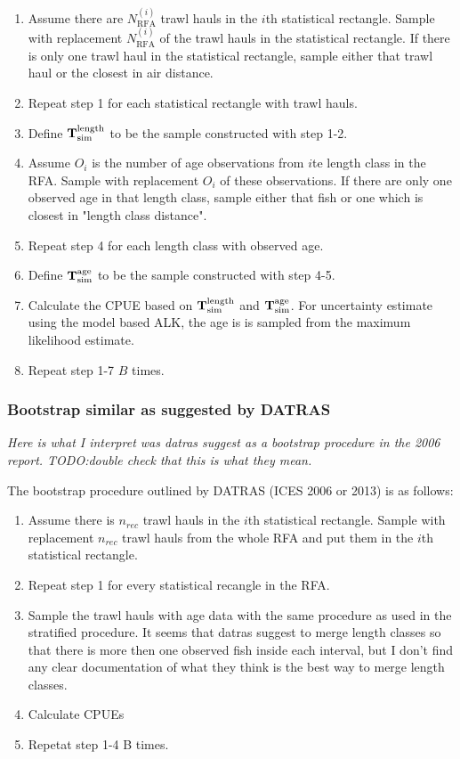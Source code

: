\documentclass[a4paper 12pt]{article}
\numberwithin{equation}{section}
\begin{document}
\begin{enumerate}
\item Assume there are $N_{\text{RFA}}^{(i)}$ trawl hauls in the $i$th statistical rectangle.  Sample with replacement $N_{\text{RFA}}^{(i)}$ of the trawl hauls in the statistical rectangle. If there is only one trawl haul in the statistical rectangle, sample either that trawl haul or the closest in air distance. 
\item Repeat step 1 for each statistical rectangle with trawl hauls. 
\item Define ${\bf T}_{\text{sim}}^{\text{length}}$ to be the sample constructed with step 1-2.
\item Assume $O_i$ is the number of age observations from $i$te length class in the RFA. Sample with replacement $O_i$ of these observations. If there are only one observed age in that length class, sample either that fish or one which is closest in "length class distance".
\item Repeat step 4 for each length class with observed age. 
\item Define ${\bf T}_{\text{sim}}^{\text{age}}$ to be the sample constructed with step 4-5. 
\item Calculate the CPUE based on ${\bf T }_{\text{sim}}^{\text{length}}$ and ${\bf T}_{\text{sim}}^{\text{age}}$.  For uncertainty estimate using the model based ALK, the age is is sampled from the maximum likelihood estimate. 
\item Repeat step 1-7 $B$ times.
\end{enumerate}  
 

\subsubsection{Bootstrap similar as suggested by DATRAS} 
\label{datrasboot} 



\emph{Here is what I interpret was datras suggest as a bootstrap procedure in the 2006 report. TODO:double check that this is what they mean. } 

The bootstrap procedure outlined by DATRAS (ICES 2006 or 2013) is as follows:
 \begin{enumerate} 
\item  Assume there is $n_{rec}$ trawl hauls in the $i$th statistical rectangle. Sample with replacement $n_{rec}$ trawl hauls from the whole RFA and put them in the $i$th statistical rectangle. 
\item Repeat step 1 for every statistical recangle in the RFA. 
\item Sample the trawl hauls with age data with the same procedure as used in the stratified procedure. It seems that datras suggest to merge length classes so that there is more then one observed fish inside each interval, but I don't find any clear documentation of what they think is the best way to merge length classes.   
\item Calculate CPUEs 
\item Repetat step 1-4 B times. 
 \end{enumerate} 
 
\end{document}
